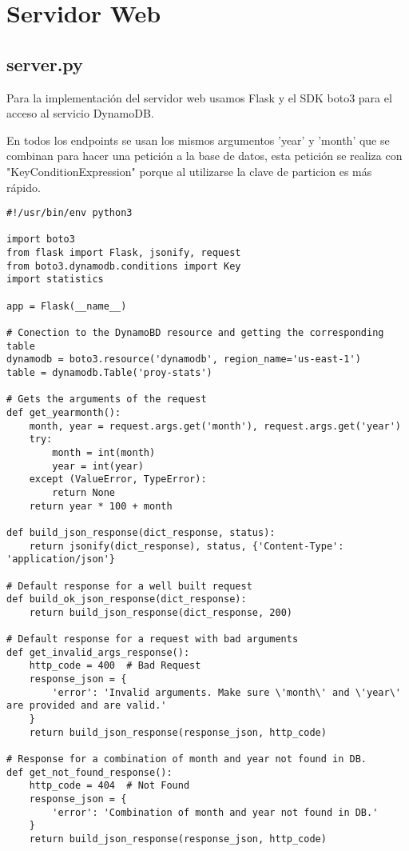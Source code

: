\section{Servidor Web}

\subsection{server.py}
Para la implementación del servidor web usamos Flask y el SDK boto3 para el acceso al servicio DynamoDB. 

En todos los endpoints se usan los mismos argumentos 'year' y 'month' que se combinan para hacer una petición a la base de datos, esta petición se realiza con "KeyConditionExpression" porque al utilizarse la clave de particion es más rápido.

\begin{verbatim}
#!/usr/bin/env python3

import boto3
from flask import Flask, jsonify, request
from boto3.dynamodb.conditions import Key
import statistics

app = Flask(__name__)

# Conection to the DynamoBD resource and getting the corresponding table
dynamodb = boto3.resource('dynamodb', region_name='us-east-1')
table = dynamodb.Table('proy-stats')

# Gets the arguments of the request
def get_yearmonth():
    month, year = request.args.get('month'), request.args.get('year')
    try:
        month = int(month)
        year = int(year)
    except (ValueError, TypeError):
        return None
    return year * 100 + month

def build_json_response(dict_response, status):
    return jsonify(dict_response), status, {'Content-Type': 'application/json'}

# Default response for a well built request
def build_ok_json_response(dict_response):
    return build_json_response(dict_response, 200)

# Default response for a request with bad arguments
def get_invalid_args_response():
    http_code = 400  # Bad Request
    response_json = {
        'error': 'Invalid arguments. Make sure \'month\' and \'year\' are provided and are valid.'
    }
    return build_json_response(response_json, http_code)

# Response for a combination of month and year not found in DB.
def get_not_found_response():
    http_code = 404  # Not Found
    response_json = {
        'error': 'Combination of month and year not found in DB.'
    }
    return build_json_response(response_json, http_code)


\end{verbatim}
